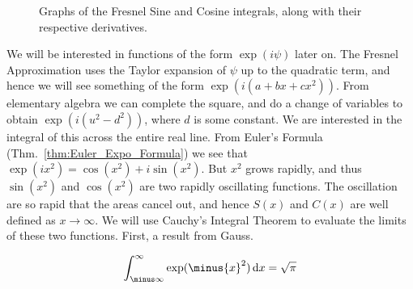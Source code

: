     \begin{figure}[H]
        \captionsetup{type=figure}
        \centering
        \begin{subfigure}[b]{0.49\textwidth}
            \centering
        \end{subfigure}
        \begin{subfigure}[b]{0.49\textwidth}
            \centering
        \end{subfigure}
        \caption[Fresnel Integrals]
            {Graphs of the Fresnel Sine and Cosine
             integrals, along with their respective derivatives.}
        \label{fig:Diff_Theory_Graphs_of_Sinx2_and_Cosx2}
    \end{figure}
    We will be interested in functions
    of the form $\exp(i\psi)$ later on. The Fresnel
    Approximation uses the Taylor expansion of $\psi$
    up to the quadratic term, and hence we will see
    something of the form $\exp(i(a+bx+cx^2))$. From
    elementary algebra we can complete the square, and
    do a change of variables to obtain
    $\exp(i(u^{2}-d^{2}))$, where $d$ is some constant.
    We are interested in the integral of this across the
    entire real line. From Euler's Formula
    (Thm.~\ref{thm:Euler_Expo_Formula}) we
    see that $\exp(ix^{2})=\cos(x^{2})+i\sin(x^{2})$.
    But $x^{2}$ grows rapidly,
    and thus $\sin(x^{2})$ and $\cos(x^{2})$ are two
    rapidly oscillating functions. The oscillation are
    so rapid that the areas cancel out, and hence
    $S(x)$ and $C(x)$ are well defined as
    $x\rightarrow\infty$. We will use Cauchy's Integral
    Theorem to evaluate the limits of these two functions.
    First, a result from Gauss.
    \begin{theorem}
        \begin{equation}
            \int_{\minus\infty}^{\infty}
                \exp(\minus{x}^{2})\diff{x}
            =\sqrt{\pi}
        \end{equation}
    \end{theorem}
